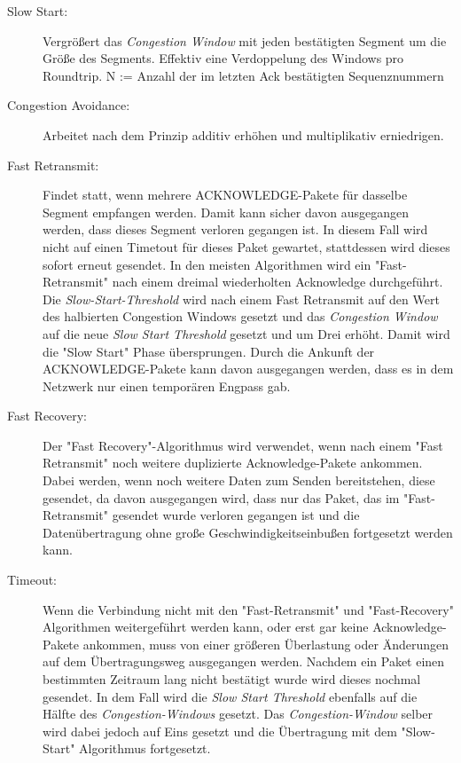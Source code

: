 \begin{description}
\item[Slow Start: ] Vergrößert das \textit{Congestion Window} mit jeden bestätigten Segment um die Größe des Segments. Effektiv eine Verdoppelung des Windows pro Roundtrip.
N := Anzahl der im letzten Ack bestätigten Sequenznummern
\item[Congestion Avoidance:] Arbeitet nach dem Prinzip additiv erhöhen und multiplikativ erniedrigen. 
\item[Fast Retransmit:] Findet statt, wenn mehrere ACKNOWLEDGE-Pakete für dasselbe Segment empfangen werden. Damit kann sicher davon ausgegangen werden, dass dieses Segment verloren gegangen ist. In diesem Fall wird nicht auf einen Timetout für dieses Paket gewartet, stattdessen wird dieses sofort erneut gesendet. In den meisten Algorithmen wird ein "{}Fast-Retransmit"{} nach einem dreimal wiederholten Acknowledge durchgeführt. Die \textit{Slow-Start-Threshold} wird nach einem Fast Retransmit auf den Wert des halbierten Congestion Windows gesetzt und das \textit{Congestion Window} auf die neue \textit{Slow Start Threshold} gesetzt und um Drei erhöht. Damit wird die "{}Slow Start"{} Phase übersprungen. Durch die Ankunft der ACKNOWLEDGE-Pakete kann davon ausgegangen werden, dass es in dem Netzwerk nur einen temporären Engpass gab. 
\item[Fast Recovery:] Der "{}Fast Recovery"{}-Algorithmus wird verwendet, wenn nach einem {}"Fast Retransmit"{} noch weitere duplizierte Acknowledge-Pakete ankommen. Dabei werden, wenn noch weitere Daten zum Senden bereitstehen, diese gesendet, da davon ausgegangen wird, dass nur das Paket, das im "{}Fast-Retransmit"{} gesendet wurde verloren gegangen ist und die Datenübertragung ohne große Geschwindigkeitseinbußen fortgesetzt werden kann. 

\item[Timeout:] Wenn die Verbindung nicht mit den "{}Fast-Retransmit{}" und {}"Fast-Recovery"{} Algorithmen weitergeführt werden kann, oder erst gar keine Acknowledge-Pakete ankommen, muss von einer größeren Überlastung oder Änderungen auf dem Übertragungsweg ausgegangen werden. Nachdem ein Paket einen bestimmten Zeitraum lang nicht bestätigt wurde wird dieses nochmal gesendet. In dem Fall wird die \textit{Slow Start Threshold} ebenfalls auf die Hälfte des \textit{Congestion-Windows} gesetzt. Das \textit{Congestion-Window} selber wird dabei jedoch auf Eins gesetzt und die Übertragung mit dem "{}Slow-Start{}" Algorithmus fortgesetzt. 
\end{description}

